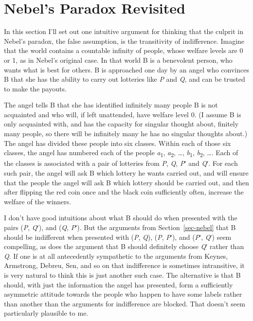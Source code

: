 \documentclass[
  11pt,
  letterpaper,
  DIV=11,
  numbers=noendperiod,
  twoside]{scrartcl}
\begin{document}
\section{Nebel's Paradox Revisited}\label{sec-nebel-revisited}

In this section I'll set out one intuitive argument for thinking that
the culprit in Nebel's paradox, the false assumption, is the
transitivity of indifference. Imagine that the world contains a
countable infinity of people, whose welfare levels are 0 or 1, as in
Nebel's original case. In that world B is a benevolent person, who wants
what is best for others. B is approached one day by an angel who
convinces B that she has the ability to carry out lotteries like
\emph{P} and \emph{Q}, and can be trusted to make the payouts.

The angel tells B that she has identified infinitely many people B is
not acquainted and who will, if left unattended, have welfare level 0.
(I assume B is only acquainted with, and has the capacity for singular
thought about, finitely many people, so there will be infinitely many he
has no singular thoughts about.) The angel has divided these people into
six classes. Within each of those six classes, the angel has numbered
each of the people \emph{a}\textsubscript{1}, \emph{a}\textsubscript{2},
\ldots, \emph{b}\textsubscript{1}, \emph{b}\textsubscript{2}, \ldots.
Each of the classes is associated with a pair of lotteries from
\emph{P}, \emph{Q}, \emph{P}ʹ and \emph{Q}ʹ. For each such pair, the
angel will ask B which lottery he wants carried out, and will ensure
that the people the angel will ask B which lottery should be carried
out, and then after flipping the {red} coin once and the black coin
sufficiently often, increase the welfare of the winners.

I don't have good intuitions about what B should do when presented with
the pairs (\emph{P}, \emph{Q}ʹ), and (\emph{Q}, \emph{P}ʹ). But the
arguments from Section~\ref{sec-nebel} that B should be indifferent when
presented with (\emph{P}, \emph{Q}), (\emph{P}, \emph{P}ʹ), and
(\emph{P}ʹ, \emph{Q}ʹ) seem compelling, as does the argument that B
should definitely choose \emph{Q}ʹ rather than \emph{Q}. If one is at
all antecedently sympathetic to the arguments from Keynes, Armstrong,
Debreu, Sen, and so on that indifference is sometimes intransitive, it
is very natural to think this is just another such case. The alternative
is that B should, with just the information the angel has presented,
form a sufficiently asymmetric attitude towards the people who happen to
have some labels rather than another than the arguments for indifference
are blocked. That doesn't seem particularly plausible to me.
\end{document}
